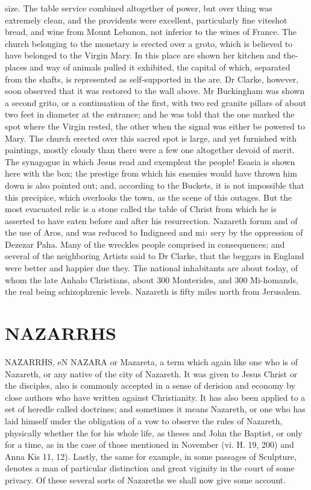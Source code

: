 \documentclass{article}
\begin{document}
size. The table service combined altogether of power, but over thing was extremely clean, and the providents were excellent, particularly fine viteshot bread, and wine from Mount Lebanon, not inferior to the wines of France. The church belonging to the monetary is erected over a groto, which is believed to have belonged to the Virgin Mary. In this place are shown her kitchen and the-places and way of animals pulled it exhibited, the capital of which, separated from the shafts, is represented as self-supported in the are. Dr Clarke, however, soon observed that it was restored to the wall above. Mr Buckingham was shown a second grito, or a continuation of the first, with two red granite pillars of about two feet in diameter at the entrance; and he was told that the one marked the spot where the Virgin rested, the other when the signal was either be powered to Mary. The church erected over this sacred spot is large, and yet furnished with paintings, mostly cloudy than there were a few one altogether devoid of merit. The synagogue in which Jesus read and exempleat the people! Esasia is shown here with the box; the prestige from which his enemies would have thrown him down is also pointed out; and, according to the Buckets, it is not impossible that this precipice, which overlooks the town, as the scene of this outages. But the most evacuated relic is a stone called the table of Christ from which he is asserted to have eaten before and after his resurrection. Nazareth forum and of the use of Aros, and was reduced to Indigneed and mi› sery by the oppression of Dezezar Paha. Many of the wreckles people comprised in consequences; and several of the neighboring Artists said to Dr Clarke, that the beggars in England were better and happier due they. The national inhabitants are about today, of whom the late Anhalo Christians, about 300 Monterides, and 300 Mi-homands, the real being schizophrenic levels. Nazareth is fifty miles north from Jerusalem.

\section*{NAZARRHS}
NAZARRHS, eN NAZARA or Mazareta, a term which again like one who is of Nazareth, or any native of the city of Nazareth. It was given to Jesus Christ or the disciples, also is commonly accepted in a sense of derision and economy by close authors who have written against Christianity. It has also been applied to a set of heredle called doctrines; and sometimes it means Nazareth, or one who has laid himself under the obligation of a vow to observe the rules of Nazareth, physically whether the for his whole life, as theses and John the Baptist, or only for a time, as in the case of those mentioned in November (vi. H. 19, 200) and Anna Kis 11, 12). Lastly, the same for example, in some passages of Sculpture, denotes a man of particular distinction and great viginity in the court of some privacy. Of these several sorts of Nazareths we shall now give some account.
\end{document}
